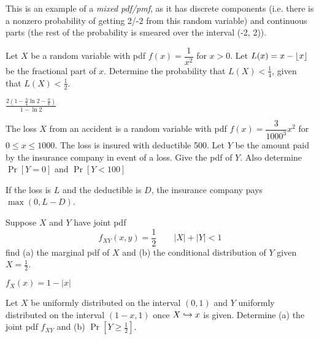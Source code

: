 \documentclass[../main.tex]{subfiles}
\begin{document}

\begin{remark}
    This is an example of a \textit{mixed pdf/pmf}, as it has discrete components (i.e. there is a nonzero probability of getting 2/-2 from this random variable) and continuous parts (the rest of the probability is smeared over the interval (-2, 2)). 
\end{remark}
\begin{example}
	Let $X$ be a random variable with pdf $f(x) = \dfrac{1}{x^2}$ for $x>0$. 
	Let $L(x) = x - \lfloor x\rfloor$ be the fractional part of $x$. Determine the
	probability that $L(X) < \frac14$, given that $L(X) < \frac12$.
\end{example}
\begin{solution}

$\frac{2(1 - \frac34 \ln 2 - \frac \pi 8)}{1-\ln 2}$
\end{solution}
\begin{example}
	The loss $X$ from an accident is a random variable with pdf $f(x) = \dfrac{3}{1000^3}x^2$ for $0 \leq x \leq 1000$. The loss is insured with
	deductible 500. Let $Y$ be the amount paid by the insurance company in event
	of a loss. Give the pdf of $Y$. Also determine $\Pr[Y=0]$ and $\Pr[Y<100]$
\end{example}
\begin{remark}
    If the loss is $L$ and the deductible is $D$, the insurance company pays $\max(0, L-D)$. 
\end{remark}
\begin{solution}
\end{solution}
\begin{example}
	Suppose $X$ and $Y$ have joint pdf
	$$f_{XY}(x,y) = \dfrac{1}{2} \qquad |X| + |Y| < 1$$
	find (a) the marginal pdf of $X$ and (b) the conditional distribution of $Y$
	given $X = \frac12$.
\end{example}
\begin{solution}
$f_X(x) = 1 - |x|$
\end{solution}
\begin{example}
	Let $X$ be uniformly distributed on the interval $(0,1)$ and $Y$
	uniformly distributed on the interval $(1-x,1)$ once $X \hookrightarrow x$ is given.
	Determine (a) the joint pdf $f_{XY}$ and (b) $\Pr[Y \geq \frac12]$.
\end{example}
\end{document}
